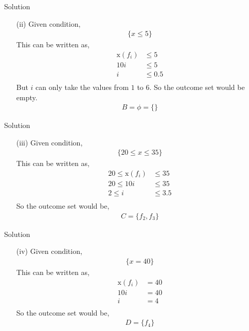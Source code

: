 \documentclass{beamer}
\providecommand{\x}[1]{\ensuremath{\text{x}\left(#1\right)}}
\begin{document}
\begin{frame}{Solution}
\begin{enumerate}
\item[(ii)] Given condition,
\begin{align*}
\{x \leq 5\}
\end{align*}
This can be written as,
\begin{align*}
\x{f_i} & \leq 5\\
10i & \leq 5\\
i & \leq 0.5\\
\end{align*}
But $i$ can only take the values from $1$ to $6$.
So the outcome set would be empty.
\begin{align*}
B = \phi = \{\} 
\end{align*}
\end{enumerate}
\end{frame}

\begin{frame}{Solution}
\begin{enumerate}
\item[(iii)] Given condition,
\begin{align*}
\{20 \leq x \leq 35\}
\end{align*}
This can be written as,
\begin{align*}
20 \leq \x{f_i} & \leq 35\\
20 \leq 10i & \leq 35\\
2 \leq i & \leq 3.5\\
\end{align*}
So the outcome set would be,
\begin{align*}
C = \{f_2, f_3\} 
\end{align*}
\end{enumerate}
\end{frame}

\begin{frame}{Solution}
\begin{enumerate}
\item[(iv)] Given condition,
\begin{align*}
\{x = 40\}
\end{align*}
This can be written as,
\begin{align*}
\x{f_i} & = 40\\
10i & = 40\\
i & = 4\\
\end{align*}
So the outcome set would be,
\begin{align*}
D = \{f_4\} 
\end{align*}
\end{enumerate}
\end{frame}
\end{document}
